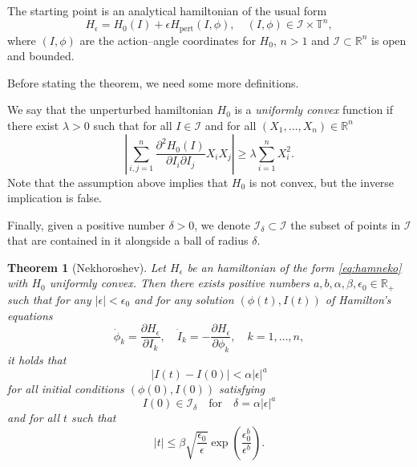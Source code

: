 \documentclass[english,fontsize=11pt,paper=a5,oneside]{scrbook}
\newcommand{\cI}{\mathcal{I}}
\newcommand{\R}{\mathbb{R}}
\newtheorem{theorem}{Theorem}[chapter]
\theoremstyle{definition}
\begin{document}
The starting point is an analytical hamiltonian of the usual form
\begin{equation}\label{eq:hamneko}
    H_\epsilon = H_0(I) + \epsilon H_{\mathrm{pert}}(I, \phi), \quad (I,\phi)\in \cI\times\mathbb{T}^n,
\end{equation}
where $(I,\phi)$ are the action--angle coordinates for $H_0$, $n>1$ and $\cI\subset\R^n$ is open and bounded.

Before stating the theorem, we need some more definitions.

We say that the unperturbed hamiltonian $H_0$ is a \emph{uniformly convex} function if there exist $\lambda >0$ such that for all $I\in\cI$ and for all $(X_1, \ldots, X_n)\in\R^n$
\begin{equation}
    \left| \sum_{i,j=1}^n \frac{\partial^2 H_0(I)}{\partial I_i \partial I_j} X_i X_j\right| \geq \lambda \sum_{i=1}^n X_i^2.
\end{equation}
Note that the assumption above implies that $H_0$ is not convex, but the inverse implication is false.

Finally, given a positive number $\delta >0$, we denote $\cI_\delta \subset\cI$ the subset of points in $\cI$ that are contained in it alongside a ball of radius $\delta$.

\begin{theorem}[Nekhoroshev]
    Let $H_\epsilon$ be an hamiltonian of the form \eqref{eq:hamneko} with $H_0$ uniformly convex.
    Then there exists positive numbers $a,b,\alpha,\beta,\epsilon_0\in\R_+$ such that for any $|\epsilon|< \epsilon_0$ and for any solution $(\phi(t), I(t))$ of Hamilton's equations
    \begin{equation}
        \dot \phi_k = \frac{\partial H_\epsilon}{\partial I_k}, \quad
        \dot I_k = - \frac{\partial H_\epsilon}{\partial \phi_k}, \quad
        k=1,\ldots,n,
    \end{equation}
    it holds that
    \begin{equation}
        |I(t)-I(0)| < \alpha |\epsilon|^a
    \end{equation}
    for all initial conditions $(\phi(0), I(0))$ satisfying
    \begin{equation}
        I(0) \in \cI_\delta\quad\mbox{for}\quad \delta = \alpha|\epsilon|^a
    \end{equation}
    and for all $t$ such that
    \begin{equation}
        |t| \leq \beta \sqrt{\frac{\epsilon_0}\epsilon} \exp\left(\frac{\epsilon^b_0}{\epsilon^b}\right).
    \end{equation}
\end{theorem}
\end{document}
